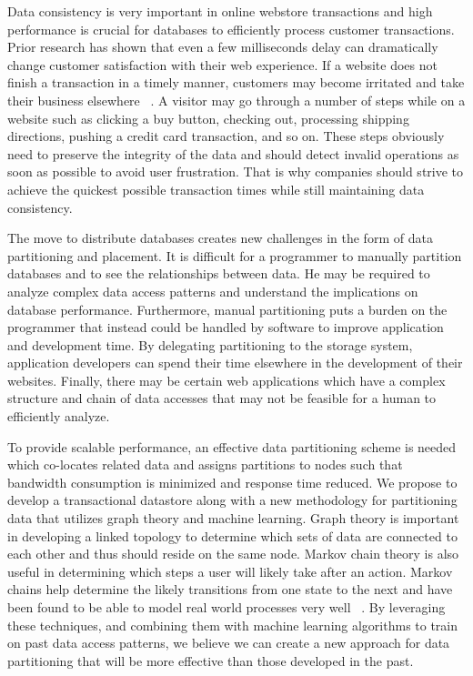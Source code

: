 \documentclass[10pt,final,journal]{IEEEtran}
\begin{document}
Data consistency is very important in online webstore transactions and high performance is crucial for databases to efficiently process customer transactions. Prior research has shown that even a few milliseconds delay can dramatically change customer satisfaction with their web experience. If a website does not finish a transaction in a timely manner, customers may become irritated and take their business elsewhere ~\cite{Ramsay:1998}. A visitor may go through a number of steps while on a website such as clicking a buy button, checking out, processing shipping directions, pushing a credit card transaction, and so on. These steps obviously need to preserve the integrity of the data and should detect invalid operations as soon as possible to avoid user frustration. That is why companies should strive to achieve the quickest possible transaction times while still maintaining data consistency.

The move to distribute databases creates new challenges in the form of data partitioning and placement. It is difficult for a programmer to manually partition databases and to see the relationships between data. He may be required to analyze complex data access patterns and understand the implications on database performance. Furthermore, manual partitioning puts a burden on the programmer that instead could be handled by software to improve application and development time. By delegating partitioning to the storage system, application developers can spend their time elsewhere in the development of their websites. Finally, there may be certain web applications which have a complex structure and chain of data accesses that may not be feasible for a human to efficiently analyze.

To provide scalable performance, an effective data partitioning scheme is needed which co-locates related data and assigns partitions to nodes such that bandwidth consumption is minimized and response time reduced. We propose to develop a transactional datastore along with a new methodology for partitioning data that utilizes graph theory and machine learning. Graph theory is important in developing a linked topology to determine which sets of data are connected to each other and thus should reside on the same node. Markov chain theory is also useful in determining which steps a user will likely take after an action. Markov chains help determine the likely transitions from one state to the next and have been found to be able to model real world processes very well ~\cite{Gilks:1996}. By leveraging these techniques, and combining them with machine learning algorithms to train on past data access patterns, we believe we can create a new approach for data partitioning that will be more effective than those developed in the past.
\end{document}
